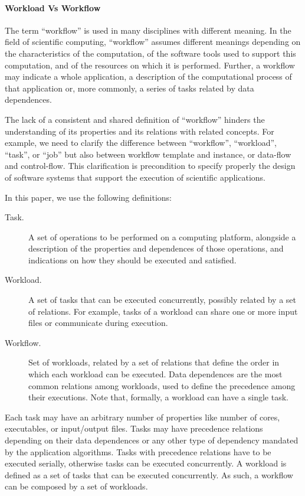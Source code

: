 \paragraph*{Workload Vs Workflow} The term ``workflow'' is used in many
disciplines with different meaning. In the field of scientific computing,
``workflow'' assumes different meanings depending on the characteristics of
the computation, of the software tools used to support this computation, and
of the resources on which it is performed. Further, a workflow may indicate a
whole application, a description of the computational process of that
application or, more commonly, a series of tasks related by data
dependences.

The lack of a consistent and shared definition of ``workflow'' hinders the
understanding of its properties and its relations with related concepts. For
example, we need to clarify the difference between ``workflow'', ``workload'',
``task'', or ``job'' but also between workflow template and instance, or
data-flow and control-flow. This clarification is precondition to specify
properly the design of software systems that support the execution of
scientific applications.

In this paper, we use the following definitions:

\begin{description}
  \item[Task.] A set of operations to be performed on a computing platform,
  alongside a description of the properties and dependences of those
  operations, and indications on how they should be executed and satisfied.
  \item[Workload.] A set of tasks that can be executed concurrently, possibly
  related by a set of relations. For example, tasks of a workload can share
  one or more input files or communicate during execution.
  \item[Workflow.] Set of workloads, related by a set of relations that define
  the order in which each workload can be executed. Data dependences are the
  most common relations among workloads, used to define the precedence among
  their executions. Note that, formally, a workload can have a single task.
\end{description}

Each task may have an arbitrary number of properties like number of cores,
executables, or input/output files. Tasks may have precedence relations
depending on their data dependences or any other type of dependency mandated
by the application algorithms. Tasks with precedence relations have to be
executed serially, otherwise tasks can be executed concurrently. A workload is
defined as a set of tasks that can be executed concurrently. As such, a
workflow can be composed by a set of workloads.

